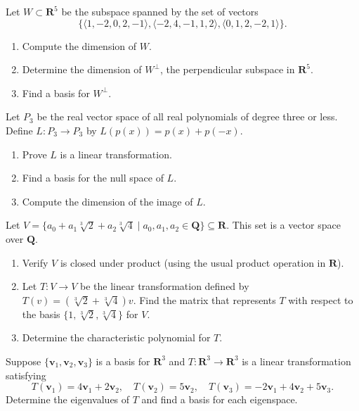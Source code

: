 \documentclass[11pt,twoside,openany]{memoir}
\begin{document}
    \begin{exercise}
    Let $W\subset \mathbf{R}^5$ be the subspace spanned by the set of vectors $$\{\langle 1,-2,0,2,-1\rangle,\langle -2,4,-1,1,2\rangle,\langle 0,1,2,-2,1\rangle\}.$$
    \begin{enumerate}[label=(\alph*)]
        \item Compute the dimension of $W$.
        \item Determine the dimension of $W^\perp$, the perpendicular subspace in $\mathbf{R}^5$.
        \item Find a basis for $W^\perp$.
    \end{enumerate}
    \end{exercise}
    
    \newpage
    \begin{exercise}
    Let $P_3$ be the real vector space of all real polynomials of degree three or less. Define $L:P_3\to P_3$ by $L(p(x))=p(x)+p(-x)$.
    \begin{enumerate}[label=(\alph*)]
        \item Prove $L$ is a linear transformation.
        \item Find a basis for the null space of $L$.
        \item Compute the dimension of the image of $L$.
    \end{enumerate}
    \end{exercise}
    
    \begin{exercise}
    Let $V=\{a_0+a_1\sqrt[3]{2}+a_2\sqrt[3]{4}\mid a_0, a_1, a_2\in \mathbf{Q}\}\subseteq \mathbf{R}$. This set is a vector space over $\mathbf{Q}$.
    \begin{enumerate}[label=(\alph*)]
        \item Verify $V$ is closed under product (using the usual product operation in $\mathbf{R}$).
        \item Let $T:V\to V$ be the linear transformation defined by $T(v)=(\sqrt[3]{2}+\sqrt[3]{4}) v$. Find the matrix that represents $T$ with respect to the basis $\{1,\sqrt[3]{2},\sqrt[3]{4}\}$ for $V$.
        \item Determine the characteristic polynomial for $T$.
    \end{enumerate}
    \end{exercise}

    \begin{exercise}
        Suppose $\{\mathbf{v}_1,\mathbf{v}_2,\mathbf{v}_3\}$ is a basis for $\mathbf{R}^3$ and $T:\mathbf{R}^3\to \mathbf{R}^3$ is a linear transformation satisfying
        \[
        T(\mathbf{v}_1) = 4\mathbf{v}_1+2\mathbf{v}_2,\quad
        T(\mathbf{v}_2) = 5\mathbf{v}_2,\quad
        T(\mathbf{v}_3) = -2\mathbf{v}_1+4\mathbf{v}_2+5\mathbf{v}_3.
        \]
        Determine the eigenvalues of $T$ and find a basis for each eigenspace.
        \end{exercise}
        
\end{document}
